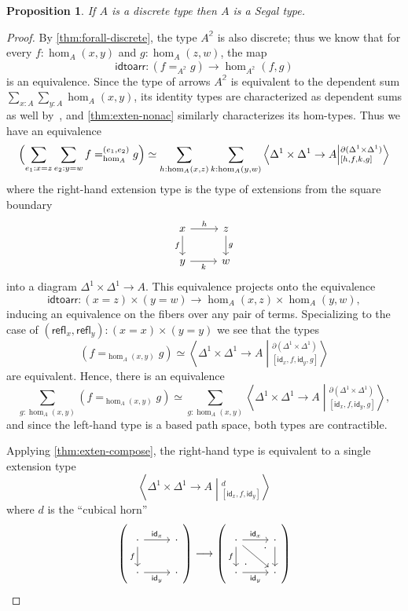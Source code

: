 \documentclass{amsart}
\theoremstyle{plain}
\newtheorem{prop}[thm]{Proposition}
\theoremstyle{definition}
\theoremstyle{remark}
\numberwithin{equation}{section}
\newcommand{\ndexten}[4]{\left\langle #1 \to #2 \middle|^{#3}_{#4}\right\rangle}
\newcommand{\refl}{\mathsf{refl}}
\newcommand{\idtoarr}{\mathsf{idtoarr}}
\newcommand{\two}{\mathbb{2}}
\newcommand{\idarr}[1]{\mathsf{id}_{#1}}
\newcommand{\Parens}[1]{\Bigl(#1\Bigr)}
\begin{document}
\begin{prop} If $A$ is a discrete type then $A$ is a Segal type.
\end{prop}
\begin{proof}
By \cref{thm:forall-discrete}, the type $A^\two$ is also discrete; thus we know that for every $f : \hom_A(x,y)$ and $g : \hom_A(z,w)$, the map
\[ \idtoarr : (f =_{A^\two} g) \to \hom_{A^\two}(f,g) \] is an equivalence. Since the type of arrows $A^\two$ is equivalent to the dependent sum $\sum_{x :A} \sum_{y : A} \hom_A(x,y)$, its identity types are characterized as dependent sums as well by~\cite[Theorem 2.7.2]{hottbook}, and \cref{thm:exten-nonac} similarly characterizes its hom-types.
Thus we have an equivalence
\[ \Parens{ \sum_{e_1: x = z} \sum_{e_2 :y = w} f =^{(e_1,e_2)}_{\hom_A} g } \simeq \sum_{h : \hom_A(x,z)} \sum_{k : \hom_A(y,w)} \ndexten{\Delta^1\times\Delta^1}{A}{\partial(\Delta^1\times\Delta^1)}{[h,f,k,g]}\]
where the right-hand extension type is the type of extensions from the square boundary
\[ \begin{tikzcd} x \arrow[d, "f"'] \arrow[r, "h"] & z \arrow[d, "g"] \\ y \arrow[r, "k"'] & w
\end{tikzcd}
\] into a diagram $\Delta^1 \times \Delta^1 \to A$. This equivalence projects onto the equivalence
\[ \idtoarr : (x = z) \times (y = w) \to \hom_A(x,z) \times \hom_A(y,w),\] inducing an equivalence on the fibers over any pair of terms. Specializing to the case of $(\refl_x, \refl_y) : (x =x ) \times (y=y)$ we see that the types
\[ (f =_{\hom_A(x,y)} g ) \simeq  \ndexten{\Delta^1\times\Delta^1}{A}{\partial(\Delta^1\times\Delta^1)}{[\idarr x, f,\idarr y, g]}\] are equivalent. Hence, there is an equivalence
\[  \sum_{g : \hom_A(x,y)} (f =_{\hom_A(x,y)} g ) \simeq  \sum_{g : \hom_A(x,y)} \ndexten{\Delta^1\times\Delta^1}{A}{\partial(\Delta^1\times\Delta^1)}{[\idarr x, f,\idarr y, g]} ,\] and since the left-hand type is a based path space, both types are contractible.

Applying \cref{thm:exten-compose}, the right-hand type is equivalent to a single extension type
\begin{equation}
\ndexten{\Delta^1\times\Delta^1}{A}{d}{[\idarr x, f,\idarr y]} \label{eq:discrete-retract}
\end{equation} 
where $d$ is the ``cubical horn''
  \[
\left( \begin{tikzcd} \cdot \arrow[r, "{\idarr x}"] \arrow[d, "f"'] & \cdot \\ \cdot \arrow[r, "{\idarr y}"'] & \cdot \end{tikzcd} \right) \longrightarrow \left( \begin{tikzcd} \cdot \arrow[r, "{\idarr x}"] \arrow[d, "f"']   \arrow[dr] & \cdot \arrow[d] \arrow[dl, phantom, "\cdot" very near start, "\cdot" very near end] \\ \cdot\arrow[r, "{\idarr y}"']  & \cdot \end{tikzcd} \right)
 \]



\end{proof}
\end{document}
